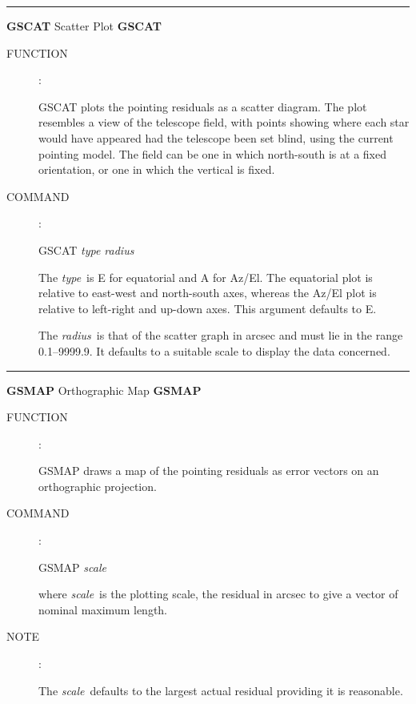 \goodbreak
\rule{\textwidth}{0.3mm}
{\Large {\bf GSCAT} \hfill Scatter Plot \hfill {\bf GSCAT}}
\begin{description}
\item [FUNCTION]:

GSCAT plots the pointing residuals as a scatter
diagram.  The plot resembles a view of the telescope field, with
points showing where each star would have appeared had
the telescope been set blind, using the current pointing model.
The field can be one in which north-south is at a fixed orientation, or
one in which the vertical is fixed.

\item [COMMAND]:

\begin{cmd}
\> \> GSCAT {\it type radius}
\end{cmd}

The {\it type}\, is E for equatorial and A for Az/El.  The equatorial
plot is relative to east-west and north-south axes,
whereas the Az/El plot
is relative to left-right and up-down axes.  This argument
defaults to E.

The {\it radius}\, is that of the scatter graph in arcsec and
must lie in the range 0.1--9999.9.  It defaults to a suitable scale to
display the data concerned.

\end{description}


\goodbreak
\rule{\textwidth}{0.3mm}
{\Large {\bf GSMAP} \hfill Orthographic Map \hfill {\bf GSMAP}}
\begin{description}
\item [FUNCTION]:

GSMAP draws a map of the pointing residuals as
error vectors on an orthographic projection.

\item [COMMAND]:

\begin{cmd}
\> \> GSMAP {\it scale}
\end{cmd}

where {\it scale}\, is the plotting scale, the residual in arcsec to
give a vector of nominal maximum length.

\item [NOTE]:

The {\it scale}\, defaults to the largest actual residual providing
it is reasonable.

\end{description}

